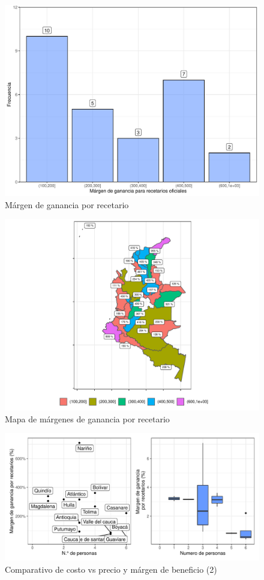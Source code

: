 \documentclass[
]{book}
\begin{document}
\begin{figure}
\includegraphics[width=0.9\linewidth]{InformeFinal_files/figure-latex/comparativoDepartamentos0-1} \caption{Márgen de ganancia por recetario}\label{fig:comparativoDepartamentos0}
\end{figure}
\begin{figure}
\includegraphics[width=0.9\linewidth]{InformeFinal_files/figure-latex/comparativoDepartamentos1-1} \caption{Mapa de márgenes de ganancia por recetario}\label{fig:comparativoDepartamentos1}
\end{figure}

\begin{figure}
\centering
\includegraphics{InformeFinal_files/figure-latex/comparativoDepartamentos2-1.pdf}
\caption{\label{fig:comparativoDepartamentos2}Comparativo de costo vs precio y márgen de beneficio (2)}
\end{figure}
\end{document}
